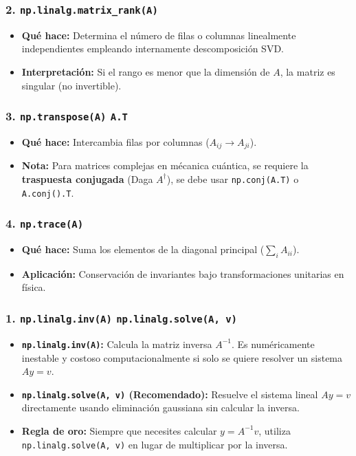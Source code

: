 \documentclass[12pt]{article}
\begin{document}
\begin{cajaflex}
\subsubsection*{\textcolor{teal!70!black}{2. \texttt{np.linalg.matrix\_rank(A)}}}
\begin{itemize}
    \item \textbf{Qué hace:} Determina el número de filas o columnas linealmente independientes empleando internamente descomposición SVD.
    \item \textbf{Interpretación:} Si el rango es menor que la dimensión de $A$, la matriz es singular (no invertible).
\end{itemize}

\subsubsection*{\textcolor{teal!70!black}{3. \texttt{np.transpose(A)}  \texttt{A.T}}}
\begin{itemize}
    \item \textbf{Qué hace:} Intercambia filas por columnas ($A_{ij} \to A_{ji}$).
    \item \textbf{Nota:} Para matrices complejas en mécanica cuántica, 
    se requiere la \textbf{traspuesta conjugada} (Daga $A^\dagger$), se debe usar \texttt{np.conj(A.T)} o \texttt{A.conj().T}.
\end{itemize}

\subsubsection*{\textcolor{teal!70!black}{4. \texttt{np.trace(A)}}}
\begin{itemize}
    \item \textbf{Qué hace:} Suma los elementos de la diagonal principal ($\sum_i A_{ii}$).
    \item \textbf{Aplicación:} Conservación de invariantes bajo transformaciones unitarias en física.
\end{itemize}

\subsubsection*{\textcolor{teal!70!black}{1. \texttt{np.linalg.inv(A)}  \texttt{np.linalg.solve(A, v)}}}
\begin{itemize}
    \item \textbf{\texttt{np.linalg.inv(A)}:} Calcula la matriz inversa $A^{-1}$. Es numéricamente inestable y costoso computacionalmente si solo se quiere resolver un sistema $A y = v$.
    \item \textbf{\texttt{np.linalg.solve(A, v)} (Recomendado):} Resuelve el sistema lineal $A y = v$ directamente usando eliminación gaussiana sin calcular la inversa.
    \item \textbf{Regla de oro:} Siempre que necesites calcular $y = A^{-1} v$, utiliza \texttt{np.linalg.solve(A, v)} en lugar de multiplicar por la inversa.
\end{itemize}


\end{cajaflex}
\end{document}
